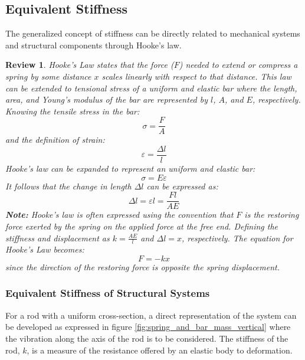 \documentclass[12pt,letter]{article}
\numberwithin{ex}{section} %
\newtheorem{re}{Review}
\numberwithin{re}{section} %
\newenvironment{review}{\begin{mdframed}[middlelinewidth=2mm,roundcorner=20pt]\begin{re}\normalfont}{\end{re}\end{mdframed}}
\numberwithin{vcs}{section} %
\begin{document}
	\subsection{Equivalent Stiffness}
		
		The generalized concept of stiffness can be directly related to mechanical systems and structural components through Hooke's law. 
		\begin{review}
			Hooke's Law states that the force ($F$) needed to extend or compress a spring by some distance $x$ scales linearly with respect to that distance. This law can be extended to tensional stress of a uniform and elastic bar where the length, area, and Young's modulus of the bar are represented by $l$, $A$, and $E$, respectively. Knowing the tensile stress in the bar:
			\begin{equation}
			\sigma = \frac{F}{A}
			\end{equation} 			
			and the definition of strain:
			\begin{equation}
			\varepsilon = \frac{\Delta l}{l}
			\end{equation} 			
			Hooke's law can be expanded to represent an uniform and elastic bar:
			\begin{equation}
			\sigma = E \varepsilon
			\end{equation} 			
			It follows that the change in length $\Delta l$ can be expressed as:		
			\begin{equation}
			\Delta l = \varepsilon l = \frac{F l}{A E}
			\end{equation} 
			\textbf{Note:} Hooke's law is often expressed using the convention that $F$ is the restoring force exerted by the spring on the applied force at the free end. Defining the stiffness and displacement as $k = \frac{AE}{l}$ and $\Delta l = x$, respectively. The equation for Hooke's Law becomes:
			\begin{equation}
			F = -kx
			\end{equation} 			
			since the direction of the restoring force is opposite the spring displacement.
		\end{review}
	
		\subsubsection{Equivalent Stiffness of Structural Systems}	
		
            For a rod with a uniform cross-section, a direct representation of the system can be developed as expressed in figure \ref{fig:spring_and_bar_mass_vertical} where the vibration along the axis of the rod is to be considered. The stiffness of the rod, $k$, is a measure of the resistance offered by an elastic body to deformation. 
\end{document}
